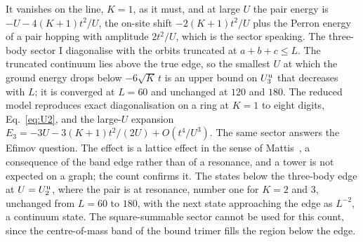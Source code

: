 \documentclass[aps,pre,twocolumn,superscriptaddress,floatfix]{revtex4-2}
\newcommand{\Ut}{U_{3}}
\newcommand{\Up}{U_{2}}
\begin{document}
It vanishes on the line, $K=1$, as it must, and at large $U$ the pair
energy is $-U-4(K+1)t^{2}/U$, the on-site shift $-2(K+1)t^{2}/U$ plus the
Perron energy of a pair hopping with amplitude $2t^{2}/U$, which is the
sector speaking. The three-body sector I diagonalise with the orbits
truncated at $a+b+c\le L$. The truncated continuum lies above the true
edge, so the smallest $U$ at which the ground energy drops below
$-6\sqrt{K}\,t$ is an upper bound on $\Ut^{\rm u}$ that decreases with $L$;
it is converged at $L=60$ and unchanged at $120$ and $180$. The reduced
model reproduces exact diagonalisation on a ring at $K=1$ to eight digits,
Eq.~\eqref{eq:U2}, and the large-$U$ expansion
$E_{3}=-3U-3(K+1)t^{2}/(2U)+O(t^{4}/U^{3})$. The same sector answers
the Efimov question. The effect is a lattice effect in the sense of
Mattis~\cite{mattis1986}, a consequence of the band edge rather than of
a resonance, and a tower is not expected on a graph; the count confirms
it. The states below the three-body edge at $U=\Up^{\rm u}$, where the
pair is at resonance, number one for $K=2$ and $3$, unchanged from
$L=60$ to $180$, with the next state approaching the edge as $L^{-2}$, a
continuum state. The square-summable sector cannot be used for this
count, since the centre-of-mass band of the bound trimer fills the
region below the edge.
\end{document}
